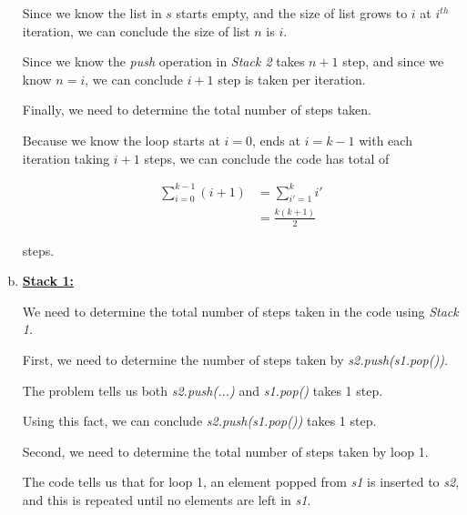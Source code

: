\documentclass[12pt]{article}
\begin{document}
\begin{enumerate}[a.]
\begin{mdframed}
        Since we know the list in $s$ starts empty, and the size of list grows to $i$ at $i^{th}$
        iteration, we can conclude the size of list $n$ is $i$.

        \bigskip

        Since we know the \textit{push} operation in \textit{Stack 2} takes $n+1$ step,
        and since we know $n = i$, we can conclude $i+1$ step is taken per iteration.

        \bigskip

        Finally, we need to determine the total number of steps taken.

        \bigskip

        Because we know the loop starts at $i = 0$, ends at $i = k-1$ with each iteration
        taking $i+1$ steps, we can conclude the code has total of

        \setcounter{equation}{0}
        \begin{align}
            \sum\limits_{i=0}^{k-1} (i+1) &= \sum\limits_{i'=1}^k i'\\
            &= \frac{k(k+1)}{2}
        \end{align}

        steps.

    \end{mdframed}

    \item

    \underline{\textbf{Stack 1:}}

    \bigskip

    We need to determine the total number of steps taken in the code using \textit{Stack 1}.

    \bigskip

    First, we need to determine the number of steps taken by \textit{s2.push(s1.pop())}.

    \bigskip

    The problem tells us both \textit{s2.push(...)} and \textit{s1.pop()} takes 1 step.

    \bigskip

    Using this fact, we can conclude \textit{s2.push(s1.pop())} takes 1 step.

    \bigskip

    Second, we need to determine the total number of steps taken by loop 1.

    \bigskip

    The code tells us that for loop 1, an element popped from \textit{s1} is inserted to \textit{s2},
    and this is repeated until no elements are left in \textit{s1}.


\end{enumerate}
\end{document}
